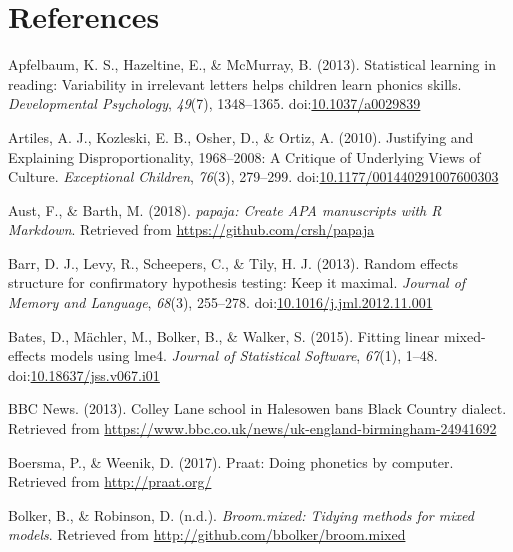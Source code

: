 \documentclass[doc,floatsintext]{apa6}
\begin{document}
\newpage

\section{References}\label{references}

\begingroup
\setlength{\parindent}{-0.5in} \setlength{\leftskip}{0.5in}

\hypertarget{refs}{}
\hypertarget{ref-Apfelbaum2013}{}
Apfelbaum, K. S., Hazeltine, E., \& McMurray, B. (2013). Statistical
learning in reading: Variability in irrelevant letters helps children
learn phonics skills. \emph{Developmental Psychology}, \emph{49}(7),
1348--1365.
doi:\href{https://doi.org/10.1037/a0029839}{10.1037/a0029839}

\hypertarget{ref-Artiles2010}{}
Artiles, A. J., Kozleski, E. B., Osher, D., \& Ortiz, A. (2010).
Justifying and Explaining Disproportionality, 1968--2008: A Critique of
Underlying Views of Culture. \emph{Exceptional Children}, \emph{76}(3),
279--299.
doi:\href{https://doi.org/10.1177/001440291007600303}{10.1177/001440291007600303}

\hypertarget{ref-R-papaja}{}
Aust, F., \& Barth, M. (2018). \emph{papaja: Create APA manuscripts with
R Markdown}. Retrieved from \url{https://github.com/crsh/papaja}

\hypertarget{ref-Barr2013}{}
Barr, D. J., Levy, R., Scheepers, C., \& Tily, H. J. (2013). Random
effects structure for confirmatory hypothesis testing: Keep it maximal.
\emph{Journal of Memory and Language}, \emph{68}(3), 255--278.
doi:\href{https://doi.org/10.1016/j.jml.2012.11.001}{10.1016/j.jml.2012.11.001}

\hypertarget{ref-R-lme4}{}
Bates, D., Mächler, M., Bolker, B., \& Walker, S. (2015). Fitting linear
mixed-effects models using lme4. \emph{Journal of Statistical Software},
\emph{67}(1), 1--48.
doi:\href{https://doi.org/10.18637/jss.v067.i01}{10.18637/jss.v067.i01}

\hypertarget{ref-BBC2013}{}
BBC News. (2013). Colley Lane school in Halesowen bans Black Country
dialect. Retrieved from
\url{https://www.bbc.co.uk/news/uk-england-birmingham-24941692}

\hypertarget{ref-Boersma2017}{}
Boersma, P., \& Weenik, D. (2017). Praat: Doing phonetics by computer.
Retrieved from \url{http://praat.org/}

\hypertarget{ref-R-broom.mixed}{}
Bolker, B., \& Robinson, D. (n.d.). \emph{Broom.mixed: Tidying methods
for mixed models}. Retrieved from
\url{http://github.com/bbolker/broom.mixed}
\end{document}
